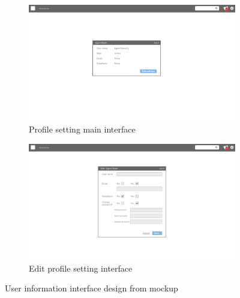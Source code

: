 \begin{figure}[H]\ContinuedFloat
	\centering
	\begin{subfigure}[b]{0.48\textwidth}
		\includegraphics[width=\textwidth]{billeder/iteration3Prototyper/Page_27.jpg}
		\caption{Profile setting main interface}
		\label{fig:5-Profile}
	\end{subfigure}
	\quad
	\begin{subfigure}[b]{0.48\textwidth}
		\includegraphics[width=\textwidth]{billeder/iteration3Prototyper/Page_28.jpg}
		\caption{Edit profile setting interface}
		\label{fig:5-ProfileEdit}
	\end{subfigure}
	\caption{User information interface design from mockup}\label{fig:5-UserMockUp}
\end{figure}


